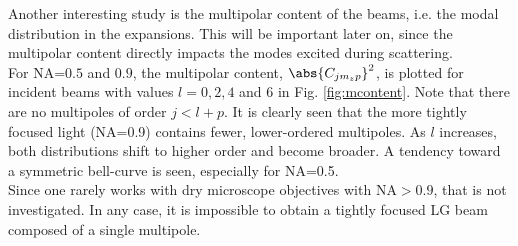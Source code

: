Another interesting study is the multipolar content of the beams, i.e. the modal distribution in the expansions. This will be important later on, since the multipolar content directly impacts the modes excited during scattering.\\
For NA=$0.5$ and $0.9$, the multipolar content, $  \abs{C_{jm_zp}}^2$, is plotted for incident beams with values $l=0, 2, 4$ and 6 in Fig. \ref{fig:mcontent}. Note that there are no multipoles of order $j<l+p$. 
It is clearly seen that the more tightly focused light (NA=0.9) contains fewer, lower-ordered multipoles. As $l$ increases, both distributions shift to higher order and become broader. A tendency toward a symmetric bell-curve is seen, especially for NA=0.5.\\
Since one rarely works with dry microscope objectives with NA$>0.9$, that is not investigated. In any case, it is impossible to obtain a tightly focused LG beam composed of a single multipole.

